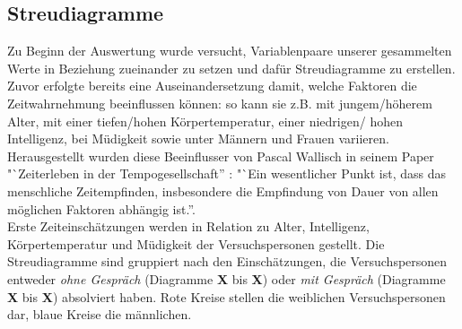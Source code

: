 \documentclass{Paper}
\begin{document}
\subsection{Streudiagramme}
Zu Beginn der Auswertung wurde versucht, Variablenpaare unserer gesammelten Werte in Beziehung zueinander zu setzen und dafür Streudiagramme zu erstellen. Zuvor erfolgte bereits eine Auseinandersetzung damit, welche Faktoren die Zeitwahrnehmung beeinflussen können: so kann sie z.B. mit jungem/höherem Alter, mit einer tiefen/hohen Körpertemperatur, einer niedrigen/ hohen Intelligenz, bei Müdigkeit sowie unter Männern und Frauen variieren. Herausgestellt wurden diese Beeinflusser von Pascal Wallisch in seinem Paper "`Zeiterleben in der Tempogesellschaft'' \cite{Wallisch2003}: "`Ein wesentlicher Punkt ist, dass das menschliche Zeitempfinden, insbesondere die
Empfindung von Dauer von allen möglichen Faktoren abhängig ist.''.\\
Erste Zeiteinschätzungen werden in Relation zu Alter, Intelligenz, Körpertemperatur und Müdigkeit der Versuchspersonen gestellt.
Die Streudiagramme sind gruppiert nach den Einschätzungen, die Versuchspersonen entweder \textit{ohne Gespräch} (Diagramme \textbf{X} bis \textbf{X}) oder \textit{mit Gespräch} (Diagramme \textbf{X} bis \textbf{X}) absolviert haben.
Rote Kreise stellen die weiblichen Versuchspersonen dar, blaue Kreise die männlichen.
\end{document}
